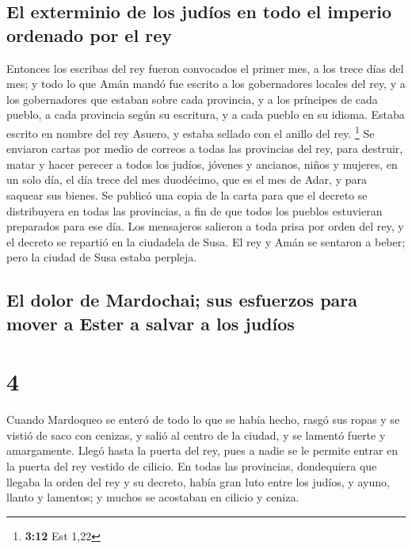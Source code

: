 \hypertarget{el-exterminio-de-los-juduxedos-en-todo-el-imperio-ordenado-por-el-rey}{%
\subsection{El exterminio de los judíos en todo el imperio ordenado por
el
rey}\label{el-exterminio-de-los-juduxedos-en-todo-el-imperio-ordenado-por-el-rey}}

 Entonces los escribas del rey fueron convocados el
primer mes, a los trece días del mes; y todo lo que Amán mandó fue
escrito a los gobernadores locales del rey, y a los gobernadores que
estaban sobre cada provincia, y a los príncipes de cada pueblo, a cada
provincia según su escritura, y a cada pueblo en su idioma. Estaba
escrito en nombre del rey Asuero, y estaba sellado con el anillo del
rey. \footnote{\textbf{3:12} Est 1,22}  Se enviaron
cartas por medio de correos a todas las provincias del rey, para
destruir, matar y hacer perecer a todos los judíos, jóvenes y ancianos,
niños y mujeres, en un solo día, el día trece del mes duodécimo, que es
el mes de Adar, y para saquear sus bienes.  Se publicó
una copia de la carta para que el decreto se distribuyera en todas las
provincias, a fin de que todos los pueblos estuvieran preparados para
ese día.  Los mensajeros salieron a toda prisa por orden
del rey, y el decreto se repartió en la ciudadela de Susa. El rey y Amán
se sentaron a beber; pero la ciudad de Susa estaba perpleja.

\hypertarget{el-dolor-de-mardochai-sus-esfuerzos-para-mover-a-ester-a-salvar-a-los-juduxedos}{%
\subsection{El dolor de Mardochai; sus esfuerzos para mover a Ester a
salvar a los
judíos}\label{el-dolor-de-mardochai-sus-esfuerzos-para-mover-a-ester-a-salvar-a-los-juduxedos}}

\hypertarget{section-3}{%
\section{4}\label{section-3}}

 Cuando Mardoqueo se enteró de todo lo que se había hecho,
rasgó sus ropas y se vistió de saco con cenizas, y salió al centro de la
ciudad, y se lamentó fuerte y amargamente.  Llegó hasta la
puerta del rey, pues a nadie se le permite entrar en la puerta del rey
vestido de cilicio.  En todas las provincias, dondequiera
que llegaba la orden del rey y su decreto, había gran luto entre los
judíos, y ayuno, llanto y lamentos; y muchos se acostaban en cilicio y
ceniza.

